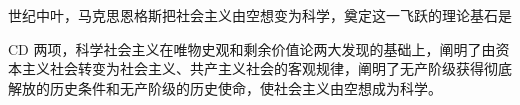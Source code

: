 世纪中叶，马克思恩格斯把社会主义由空想变为科学，奠定这一飞跃的理论基石是
\par{}
\begin{solution}CD
两项，科学社会主义在唯物史观和剩余价值论两大发现的基础上，阐明了由资本主义社会转变为社会主义、共产主义社会的客观规律，阐明了无产阶级获得彻底解放的历史条件和无产阶级的历史使命，使社会主义由空想成为科学。
\end{solution}
